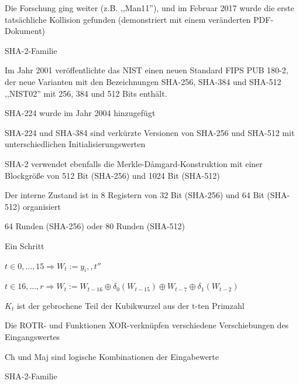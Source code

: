 \documentclass[a4paper]{article}
\begin{document}
\begin{multicols}{3}
\begin{itemize*}
\begin{itemize*}
                  \item Die Forschung ging weiter (z.B. ,,Man11''), und im Februar 2017 wurde die erste tatsächliche Kollision gefunden (demonstriert mit einem veränderten PDF-Dokument)
            \end{itemize*}
            \item SHA-2-Familie
            \begin{itemize*}
                  \item Im Jahr 2001 veröffentlichte das NIST einen neuen Standard FIPS PUB 180-2, der neue Varianten mit den Bezeichnungen SHA-256, SHA-384 und SHA-512 ,,NIST02'' mit 256, 384 und 512 Bits enthält.
                  \item SHA-224 wurde im Jahr 2004 hinzugefügt
                  \item SHA-224 und SHA-384 sind verkürzte Versionen von SHA-256 und SHA-512 mit unterschiedlichen Initialisierungswerten
                  \item SHA-2 verwendet ebenfalls die Merkle-Dåmgard-Konstruktion mit einer Blockgröße von 512 Bit (SHA-256) und 1024 Bit (SHA-512)
                  \item Der interne Zustand ist in 8 Registern von 32 Bit (SHA-256) und 64 Bit (SHA-512) organisiert
                  \item 64 Runden (SHA-256) oder 80 Runden (SHA-512)
            \end{itemize*}
            \item Ein Schritt
            \begin{itemize*}
                  \item $t\in{0, ..., 15}\Rightarrow W_t:=y_i,,t''$
                  \item $t\in{16, ..., r}\Rightarrow W_t:=W_{t-16}\oplus \delta_0(W_{t-15})\oplus W_{t-7}\oplus\delta_1(W_{t-2})$
                  \item $K_t$ ist der gebrochene Teil der Kubikwurzel aus der t-ten Primzahl
                  \item Die ROTR- und Funktionen XOR-verknüpfen verschiedene Verschiebungen des Eingangswertes
                  \item Ch und Maj sind logische Kombinationen der Eingabewerte
            \end{itemize*}
            \item SHA-2-Familie
            \begin{itemize*}

\end{itemize*}
\end{itemize*}
\end{multicols}
\end{document}
